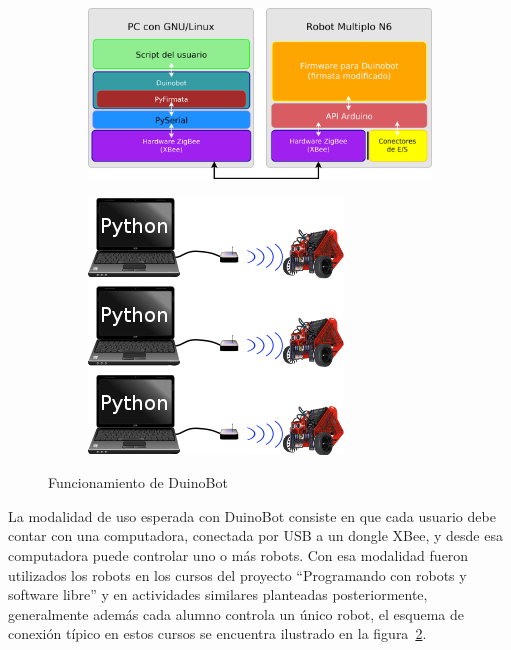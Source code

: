 \begin{figure}
    \centering
    \begin{subfigure}[b]{0.7\textwidth}
        \includegraphics[width=.95\textwidth]{figures/diagrama_duinobot}
        \label{fig:funcionamiento_duinobot_diagrama}
    \end{subfigure}
    \begin{subfigure}[b]{0.29\textwidth}
        \includegraphics[width=\textwidth]{figures/arquitectura_actual}
        \label{fig:funcionamiento_duinobot_conexion}
    \end{subfigure}
    \caption{Funcionamiento de DuinoBot}
    \label{fig:funcionamiento_duinobot}
\end{figure}

La modalidad de uso esperada con DuinoBot consiste en que cada usuario
debe contar con una computadora, conectada por USB a un dongle XBee,
y desde esa computadora puede controlar uno o más robots. Con esa modalidad
fueron utilizados los robots en los cursos del proyecto
``Programando con robots y software libre'' y en actividades similares
planteadas posteriormente, generalmente además cada alumno controla
un único robot, el esquema de conexión típico en estos cursos se encuentra
ilustrado en la figura~\ref{fig:funcionamiento_duinobot_conexion}.

